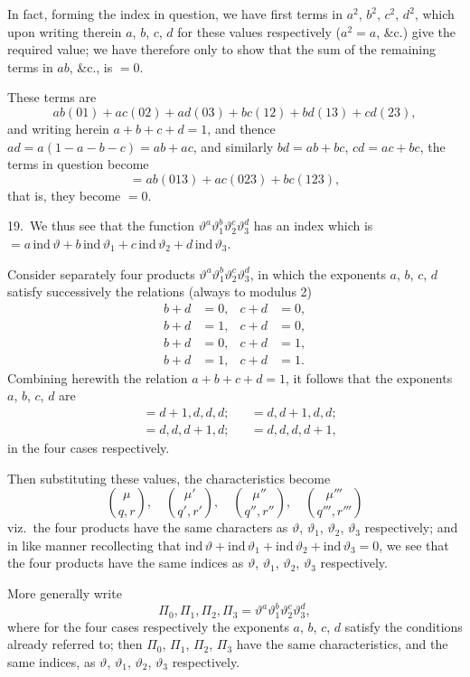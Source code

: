 \documentclass[11pt,a4paper]{book}
\begin{document}
In fact, forming the index in question, we have first terms in $a^2$, $b^2$, $c^2$, $d^2$, which upon writing therein $a$, $b$, $c$, $d$ for these values respectively ($a^2 = a$, \&c.) give the required value; we have therefore only to show that the sum of the remaining terms in $ab$, \&c., is $= 0$.

These terms are
\[
ab(01) + ac(02) + ad(03) + bc(12) + bd(13) + cd(23),
\]
and writing herein $a + b + c + d = 1$, and thence $ad = a(1 - a - b - c) = ab + ac$, and similarly $bd = ab + bc$, $cd = ac + bc$, the terms in question become
\[
= ab(013) + ac(023) + bc(123),
\]
that is, they become $= 0$.

\medskip

19.\ We thus see that the function $\vartheta^a\vartheta_1^b\vartheta_2^c\vartheta_3^d$ has an index which is $= a\,\text{ind}\,\vartheta + b\,\text{ind}\,\vartheta_1 + c\,\text{ind}\,\vartheta_2 + d\,\text{ind}\,\vartheta_3$.

Consider separately four products $\vartheta^a\vartheta_1^b\vartheta_2^c\vartheta_3^d$, in which the exponents $a$, $b$, $c$, $d$ satisfy successively the relations (always to modulus 2)
\begin{align*}
b + d &= 0, & c + d &= 0,\\
b + d &= 1, & c + d &= 0,\\
b + d &= 0, & c + d &= 1,\\
b + d &= 1, & c + d &= 1.
\end{align*}
Combining herewith the relation $a + b + c + d = 1$, it follows that the exponents $a$, $b$, $c$, $d$ are
\begin{align*}
&= d + 1, d, d, d; & &= d, d + 1, d, d;\\
&= d, d, d + 1, d; & &= d, d, d, d + 1,
\end{align*}
in the four cases respectively.

Then substituting these values, the characteristics become
\[
\binom{\mu}{q, r}, \quad \binom{\mu'}{q', r'}, \quad \binom{\mu''}{q'', r''}, \quad \binom{\mu'''}{q''', r'''}
\]
viz.\ the four products have the same characters as $\vartheta$, $\vartheta_1$, $\vartheta_2$, $\vartheta_3$ respectively; and in like manner recollecting that $\text{ind}\,\vartheta + \text{ind}\,\vartheta_1 + \text{ind}\,\vartheta_2 + \text{ind}\,\vartheta_3 = 0$, we see that the four products have the same indices as $\vartheta$, $\vartheta_1$, $\vartheta_2$, $\vartheta_3$ respectively.

More generally write
\[
\Pi_0, \Pi_1, \Pi_2, \Pi_3 = \vartheta^a\vartheta_1^b\vartheta_2^c\vartheta_3^d,
\]
where for the four cases respectively the exponents $a$, $b$, $c$, $d$ satisfy the conditions already referred to; then $\Pi_0$, $\Pi_1$, $\Pi_2$, $\Pi_3$ have the same characteristics, and the same indices, as $\vartheta$, $\vartheta_1$, $\vartheta_2$, $\vartheta_3$ respectively.
\end{document}
